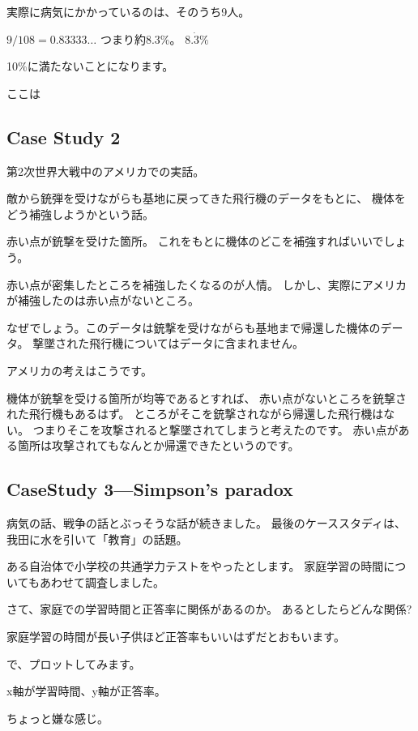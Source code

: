 \documentclass[uplatex,jis2004,dvipdfmx,12pt]{jsarticle}
\begin{document}
実際に病気にかかっているのは、そのうち9人。

$9/108=0.83333\dots$
つまり約8.3\%。
$8.\dot{3}\%$

10\%に満たないことになります。


ここは



\subsection{Case Study 2}

第2次世界大戦中のアメリカでの実話。

敵から銃弾を受けながらも基地に戻ってきた飛行機のデータをもとに、
機体をどう補強しようかという話。

赤い点が銃撃を受けた箇所。
これをもとに機体のどこを補強すればいいでしょう。

赤い点が密集したところを補強したくなるのが人情。
しかし、実際にアメリカが補強したのは赤い点がないところ。

なぜでしょう。このデータは銃撃を受けながらも基地まで帰還した機体のデータ。
撃墜された飛行機についてはデータに含まれません。

アメリカの考えはこうです。

機体が銃撃を受ける箇所が均等であるとすれば、
赤い点がないところを銃撃された飛行機もあるはず。
ところがそこを銃撃されながら帰還した飛行機はない。
つまりそこを攻撃されると撃墜されてしまうと考えたのです。
赤い点がある箇所は攻撃されてもなんとか帰還できたというのです。





\subsection{CaseStudy 3---Simpson's paradox}


病気の話、戦争の話とぶっそうな話が続きました。
最後のケーススタディは、我田に水を引いて「教育」の話題。


ある自治体で小学校の共通学力テストをやったとします。
家庭学習の時間についてもあわせて調査しました。


さて、家庭での学習時間と正答率に関係があるのか。
あるとしたらどんな関係?

家庭学習の時間が長い子供ほど正答率もいいはずだとおもいます。

で、プロットしてみます。

x軸が学習時間、y軸が正答率。

ちょっと嫌な感じ。
\end{document}
